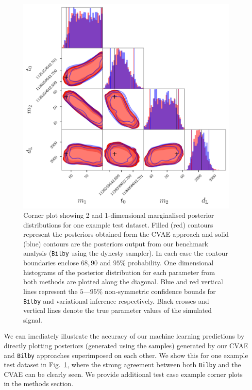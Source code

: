 \documentclass[%
showpacs,
 amsmath,amssymb,
 aps,
 twocolumn,
 prl,
 reprint,
floatfix,
]{revtex4-1}
\newcommand{\chris}[1]{\textbf{\textcolor{red}{CHRIS: #1}}}
\newcommand{\hunter}[1]{\textbf{\textcolor{blue}{HUNTER: #1}}}
\begin{document}
%
%
\begin{figure}
    \includegraphics[width=\textwidth]{images/corner_testcase0.png}
    \caption{\label{fig:corner_plot} Corner plot showing 2 and 1-dimensional
marginalised posterior distributions for one example test dataset. Filled (red)
contours represent the posteriors obtained form the \ac{CVAE} approach and
solid (blue) contours are the posteriors output from our benchmark analysis
(\texttt{Bilby} using the dynesty sampler). In each case the contour boundaries
enclose $68,90$ and $95\%$ probability. One dimensional histograms of the
posterior distribution for each parameter from both methods are plotted along
the diagonal. Blue and red vertical lines represent the $5$---$95\%$
non-symmetric confidence bounds for \texttt{Bilby} and variational inference
respectively. Black crosses and vertical lines denote the true parameter values
of the simulated signal.
} 
\end{figure}

%
%
We can imediately illustrate the accuracy of our machine learning predictions
by directly plotting posteriors (generated using the samples) generated by our
\ac{CVAE} and \texttt{Bilby} approaches superimposed on each other. We show
this for one example test dataset in Fig.~\ref{fig:corner_plot}, where the
strong agreement between both \texttt{Bilby} and the \ac{CVAE} can be clearly
seen. We provide additional test case example corner plots in the
methods section. 
\end{document}
